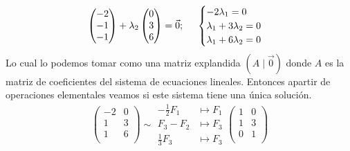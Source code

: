 \documentclass{article}
\begin{document}
\begin{enumerate}
\begin{itemize}
\begin{itemize}
\[\begin{pmatrix}
                            -2 \\ -1 \\ -1
                        \end{pmatrix}
                        +
                        \lambda_2
                        \begin{pmatrix}
                            0 \\ 3 \\ 6
                        \end{pmatrix}
                        =
                        \vec{0};
                        \hspace{0.5cm}
                        \begin{cases}
                            -2\lambda_1  = 0 \\
                            \lambda_1 + 3\lambda_2 = 0 \\
                            \lambda_1 + 6\lambda_2 = 0
                        \end{cases}
                    \]
                    Lo cual lo podemos tomar como una matriz explandida \(\left(A\mid\vec{0}\right)\) donde \(A\) es la matriz de coeficientes del sistema de ecuaciones lineales. 
                    Entonces apartir de operaciones elementales veamos si este sistema tiene una única solución.
                    \[
                        \begin{pmatrix}
                            -2 & 0 \\
                            1 & 3 \\
                            1 & 6 \\
                        \end{pmatrix}
                        \sim
                        \begin{aligned}
                            -\frac{1}{2}F_1 &\mapsto F_1 \\
                            F_3 - F_2 &\mapsto F_3 \\
                            \frac{1}{3}F_3 &\mapsto F_3 
                        \end{aligned}
                        \begin{pmatrix}
                            1 & 0 \\
                            1 & 3 \\
                            0 & 1 \\
                        \end{pmatrix}
\]
\end{itemize}
\end{itemize}
\end{enumerate}
\end{document}
